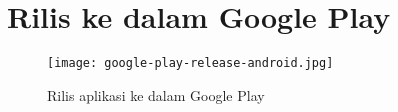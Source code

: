 \chapter{Rilis ke dalam Google Play}
\label{lamp:G}

\def\scl{1}
\def\leg{} 
\def\std{none}
\def\ymin{}
\def\ymax{}


\begin{figure}[H]
\centering
\texttt{[image: google-play-release-android.jpg]}
\caption{Rilis aplikasi ke dalam Google Play}
\end{figure}